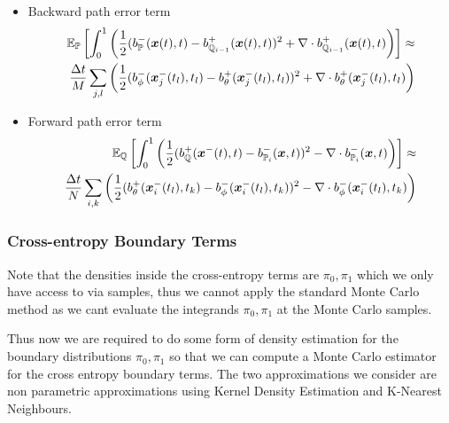 \documentclass[a4paper,12pt,twoside,openright]{report}
\theoremstyle{definition}
\begin{document}
\begin{itemize}
    \item Backward path error term 
\begin{align}
    \mathbb{E}_{{\mathbb{P}}}\left[\int_0^1 \left(\frac{1}{2}(b_{\mathbb{P}}^{-}({\bm{x}}(t),t) - b_{{\mathbb{Q}}_{i-1}}^{+}({\bm{x}}(t),t))^2 + \nabla\cdot b^{+}_{{\mathbb{Q}}_{i-1}}({\bm{x}}(t),t) \right)\right] \approx \nonumber   \\
    \frac{\Delta t}{M} \sum_{j,l}\left(\frac{1}{2}(b_\phi^{-}({\bm{x}}^{-}_j(t_l), t_l) - b_{\theta}^{+}({\bm{x}}^{-}_j(t_l), t_l))^2 + \nabla\cdot b^{+}_{\theta}({\bm{x}}^{-}_j(t_l), t_l)\right)
\end{align}
    \item Forward path error term
\begin{align}
    \mathbb{E}_{{\mathbb{Q}}}\left[\int_0^1 \left(\frac{1}{2}(b_{\mathbb{Q}}^{+}({\bm{x}}^{-}(t), t) - b_{{\mathbb{P}}_{i}}^{-}({\bm{x}}, t))^2 - \nabla\cdot b^{-}_{{\mathbb{P}}_{i}}({\bm{x}}, t) \right)\right]  \approx \nonumber   \\
    \frac{\Delta t}{N} \sum_{i,k}\left(\frac{1}{2}(b_\theta^{+}({\bm{x}}^{-}_i(t_l), t_k) - b_{\phi}^{-}({\bm{x}}^{-}_i(t_l), t_k))^2 - \nabla\cdot b^{-}_{\phi}({\bm{x}}^{-}_i(t_l), t_k)\right)
\end{align}
\end{itemize}
\subsubsection{Cross-entropy Boundary Terms}

Note that the densities inside the cross-entropy terms are $\pi_0, \pi_1$ which we only have access to via samples, thus we cannot apply the standard Monte Carlo  method as we cant evaluate the integrands $\pi_0, \pi_1$ at the Monte Carlo  samples.

Thus now we are required to do some form of density estimation for the boundary distributions $\pi_0, \pi_1$ so that we can compute a Monte Carlo  estimator for the cross entropy boundary terms. The two approximations we consider are non parametric approximations using Kernel Density Estimation and K-Nearest Neighbours.
\end{document}
